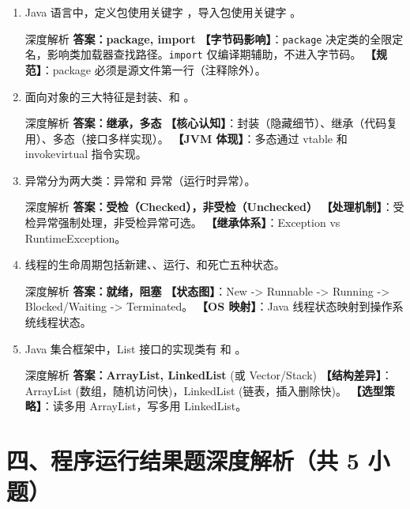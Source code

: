 ﻿\documentclass[12pt, a4paper]{ctexart}
\newcommand{\code}[1]{\texttt{#1}}
\newcommand{\blank}{\underline{\hspace{2em}}}
\begin{document}
\begin{enumerate}[label=\textbf{\arabic*.}, itemsep=1em]
	\item Java 语言中，定义包使用关键字 \blank，导入包使用关键字 \blank。
	      \begin{bluebox}{深度解析}
		      \textbf{答案：package, import}
		      \textbf{【字节码影响】}：\code{package} 决定类的全限定名，影响类加载器查找路径。\code{import} 仅编译期辅助，不进入字节码。
		      \textbf{【规范】}：package 必须是源文件第一行（注释除外）。
	      \end{bluebox}

	\item 面向对象的三大特征是封装、\blank 和 \blank。
	      \begin{bluebox}{深度解析}
		      \textbf{答案：继承，多态}
		      \textbf{【核心认知】}：封装（隐藏细节）、继承（代码复用）、多态（接口多样实现）。
		      \textbf{【JVM 体现】}：多态通过 vtable 和 invokevirtual 指令实现。
	      \end{bluebox}

	\item 异常分为两大类：\blank 异常和 \blank 异常（运行时异常）。
	      \begin{bluebox}{深度解析}
		      \textbf{答案：受检（Checked），非受检（Unchecked）}
		      \textbf{【处理机制】}：受检异常强制处理，非受检异常可选。
		      \textbf{【继承体系】}：Exception vs RuntimeException。
	      \end{bluebox}

	\item 线程的生命周期包括新建、\blank、运行、\blank 和死亡五种状态。
	      \begin{bluebox}{深度解析}
		      \textbf{答案：就绪，阻塞}
		      \textbf{【状态图】}：New -> Runnable -> Running -> Blocked/Waiting -> Terminated。
		      \textbf{【OS 映射】}：Java 线程状态映射到操作系统线程状态。
	      \end{bluebox}

	\item Java 集合框架中，List 接口的实现类有 \blank 和 \blank。
	      \begin{bluebox}{深度解析}
		      \textbf{答案：ArrayList, LinkedList} (或 Vector/Stack)
		      \textbf{【结构差异】}：ArrayList (数组，随机访问快)，LinkedList (链表，插入删除快)。
		      \textbf{【选型策略】}：读多用 ArrayList，写多用 LinkedList。
	      \end{bluebox}
\end{enumerate}

\section*{四、程序运行结果题深度解析（共 5 小题）}
\end{document}
